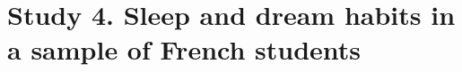 \cleardoublepage

\chapter{Study 4. Sleep and dream habits in a sample of French students}
\label{res:survey}

\cleardoublepage





\cleardoublepage
